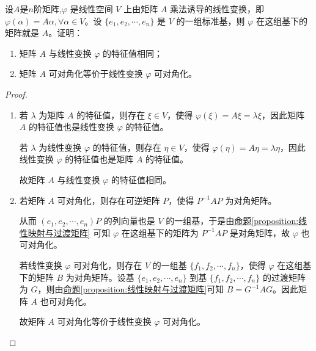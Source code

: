 \documentclass[../../main.tex]{subfiles}%
\begin{document}
\begin{lemma}\label{lemma:线性变换与矩阵的可对角化等价,特征值相同}
设$A$是$n$阶矩阵,$\varphi$ 是线性空间 $V$ 上由矩阵 $A$ 乘法诱导的线性变换，即 $\varphi(\alpha) = A\alpha, \forall \alpha \in V$。设 $\{e_1, e_2, \cdots, e_n\}$ 是 $V$ 的一组标准基，则 $\varphi$ 在这组基下的矩阵就是 $A$。证明：
\begin{enumerate}[(1)]
\item 矩阵 $A$ 与线性变换 $\varphi$ 的特征值相同；

\item 矩阵 $A$ 可对角化等价于线性变换 $\varphi$ 可对角化。
\end{enumerate}
\end{lemma}
\begin{proof}
\begin{enumerate}[(1)]
\item 若 $\lambda$ 为矩阵 $A$ 的特征值，则存在 $\xi \in V$，使得 $\varphi(\xi) = A\xi = \lambda \xi$，因此矩阵 $A$ 的特征值也是线性变换 $\varphi$ 的特征值。

若 $\lambda$ 为线性变换 $\varphi$ 的特征值，则存在 $\eta \in V$，使得 $\varphi(\eta) = A\eta = \lambda \eta$，因此线性变换 $\varphi$ 的特征值也是矩阵 $A$ 的特征值。

故矩阵 $A$ 与线性变换 $\varphi$ 的特征值相同。

\item 若矩阵 $A$ 可对角化，则存在可逆矩阵 $P$，使得 $P^{-1}AP$ 为对角矩阵。

从而 $(e_1, e_2, \cdots, e_n)P$ 的列向量也是 $V$ 的一组基，于是由\hyperref[proposition:线性映射与过渡矩阵]{命题\ref{proposition:线性映射与过渡矩阵}} 可知 $\varphi$ 在这组基下的矩阵为 $P^{-1}AP$ 是对角矩阵，故 $\varphi$ 也可对角化。

若线性变换 $\varphi$ 可对角化，则存在 $V$ 的一组基 $\{f_1, f_2, \cdots, f_n\}$，使得 $\varphi$ 在这组基下的矩阵 $B$ 为对角矩阵。设基 $\{e_1, e_2, \cdots, e_n\}$ 到基 $\{f_1, f_2, \cdots, f_n\}$ 的过渡矩阵为 $G$，则由\hyperref[proposition:线性映射与过渡矩阵]{命题\ref{proposition:线性映射与过渡矩阵}}可知 $B = G^{-1}AG$。因此矩阵 $A$ 也可对角化。

故矩阵 $A$ 可对角化等价于线性变换 $\varphi$ 可对角化。
\end{enumerate}

\end{proof}
\end{document}
